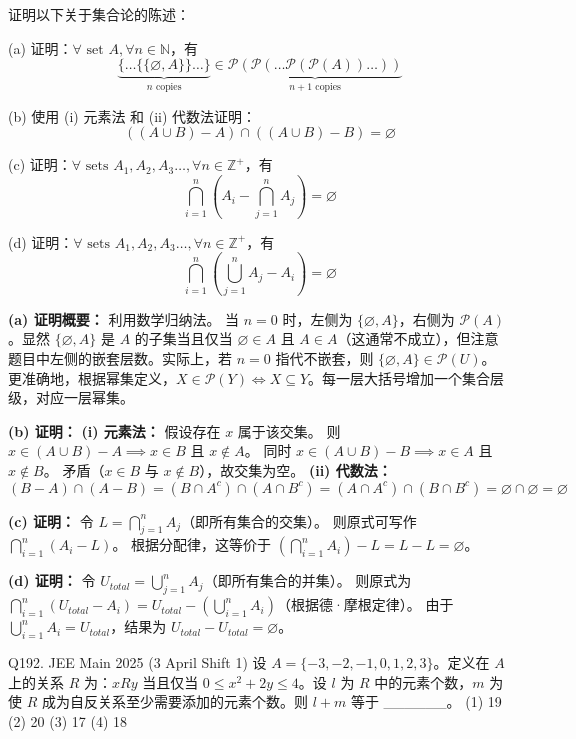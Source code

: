 \begin{questions}
\question
证明以下关于集合论的陈述：

(a) 证明：$\forall \text{ set } A, \forall n \in \mathbb{N}$，有
\[
\underbrace{\{\dots\{\{\varnothing, A\}\} \dots\}}_{n \text{ copies}} \in \underbrace{\mathcal{P}(\mathcal{P}(\dots\mathcal{P}(\mathcal{P}(A))\dots))}_{n+1 \text{ copies}}
\]

(b) 使用 (i) 元素法 和 (ii) 代数法证明：
\[
((A \cup B) - A) \cap ((A \cup B) - B) = \varnothing
\]

(c) 证明：$\forall \text{ sets } A_1, A_2, A_3 \dots, \forall n \in \mathbb{Z}^+$，有
\[
\bigcap_{i=1}^{n} \left( A_i - \bigcap_{j=1}^{n} A_j \right) = \varnothing
\]

(d) 证明：$\forall \text{ sets } A_1, A_2, A_3 \dots, \forall n \in \mathbb{Z}^+$，有
\[
\bigcap_{i=1}^{n} \left( \bigcup_{j=1}^{n} A_j - A_i \right) = \varnothing
\]

\begin{solution}
\textbf{(a) 证明概要：}
利用数学归纳法。
当 $n=0$ 时，左侧为 $\{\varnothing, A\}$，右侧为 $\mathcal{P}(A)$。显然 $\{\varnothing, A\}$ 是 $A$ 的子集当且仅当 $\varnothing \in A$ 且 $A \in A$（这通常不成立），但注意题目中左侧的嵌套层数。实际上，若 $n=0$ 指代不嵌套，则 $\{\varnothing, A\} \in \mathcal{P}(U)$。
更准确地，根据幂集定义，$X \in \mathcal{P}(Y) \iff X \subseteq Y$。每一层大括号增加一个集合层级，对应一层幂集。

\textbf{(b) 证明：}
\textbf{(i) 元素法：} 假设存在 $x$ 属于该交集。
则 $x \in (A \cup B) - A \implies x \in B$ 且 $x \notin A$。
同时 $x \in (A \cup B) - B \implies x \in A$ 且 $x \notin B$。
矛盾（$x \in B$ 与 $x \notin B$），故交集为空。
\textbf{(ii) 代数法：}
\[
(B - A) \cap (A - B) = (B \cap A^c) \cap (A \cap B^c) = (A \cap A^c) \cap (B \cap B^c) = \varnothing \cap \varnothing = \varnothing
\]

\textbf{(c) 证明：}
令 $L = \bigcap_{j=1}^{n} A_j$（即所有集合的交集）。
则原式可写作 $\bigcap_{i=1}^{n} (A_i - L)$。
根据分配律，这等价于 $(\bigcap_{i=1}^{n} A_i) - L = L - L = \varnothing$。

\textbf{(d) 证明：}
令 $U_{total} = \bigcup_{j=1}^{n} A_j$（即所有集合的并集）。
则原式为 $\bigcap_{i=1}^{n} (U_{total} - A_i) = U_{total} - (\bigcup_{i=1}^{n} A_i)$（根据德·摩根定律）。
由于 $\bigcup_{i=1}^{n} A_i = U_{total}$，结果为 $U_{total} - U_{total} = \varnothing$。
\end{solution}


    \question
Q192. JEE Main 2025 (3 April Shift 1)
设 $A = \{-3, -2, -1, 0, 1, 2, 3\}$。定义在 $A$ 上的关系 $R$ 为：$xRy$ 当且仅当 $0 \le x^2 + 2y \le 4$。设 $l$ 为 $R$ 中的元素个数，$m$ 为使 $R$ 成为自反关系至少需要添加的元素个数。则 $l + m$ 等于 \_\_\_\_\_\_。
(1) 19 \quad (2) 20 \quad (3) 17 \quad (4) 18


\end{questions}
